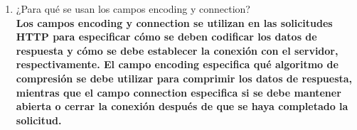 \documentclass[14pt]{book}
\begin{document}
\begin{enumerate}
{\begin{enumerate}
  \end{enumerate}}
  \item ¿Para qué se usan los campos encoding y connection?\\
  \textbf{Los campos encoding y connection se utilizan en las solicitudes HTTP para especificar cómo se deben codificar los datos de respuesta y cómo se debe establecer la conexión con el servidor, respectivamente. El campo encoding especifica qué algoritmo de compresión se debe utilizar para comprimir los datos de respuesta, mientras que el campo connection especifica si se debe mantener abierta o cerrar la conexión después de que se haya completado la solicitud.}
\end{enumerate}
\end{document}
